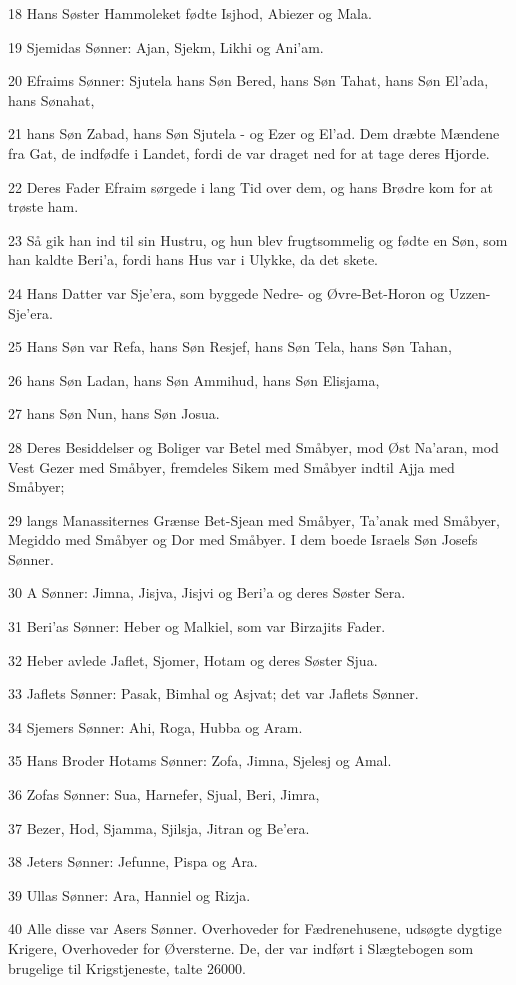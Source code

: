 \par 18 Hans Søster Hammoleket fødte Isjhod, Abiezer og Mala.
\par 19 Sjemidas Sønner: Ajan, Sjekm, Likhi og Ani'am.
\par 20 Efraims Sønner: Sjutela hans Søn Bered, hans Søn Tahat, hans Søn El'ada, hans Sønahat,
\par 21 hans Søn Zabad, hans Søn Sjutela - og Ezer og El'ad. Dem dræbte Mændene fra Gat, de indfødfe i Landet, fordi de var draget ned for at tage deres Hjorde.
\par 22 Deres Fader Efraim sørgede i lang Tid over dem, og hans Brødre kom for at trøste ham.
\par 23 Så gik han ind til sin Hustru, og hun blev frugtsommelig og fødte en Søn, som han kaldte Beri'a, fordi hans Hus var i Ulykke, da det skete.
\par 24 Hans Datter var Sje'era, som byggede Nedre- og Øvre-Bet-Horon og Uzzen-Sje'era.
\par 25 Hans Søn var Refa, hans Søn Resjef, hans Søn Tela, hans Søn Tahan,
\par 26 hans Søn Ladan, hans Søn Ammihud, hans Søn Elisjama,
\par 27 hans Søn Nun, hans Søn Josua.
\par 28 Deres Besiddelser og Boliger var Betel med Småbyer, mod Øst Na'aran, mod Vest Gezer med Småbyer, fremdeles Sikem med Småbyer indtil Ajja med Småbyer;
\par 29 langs Manassiternes Grænse Bet-Sjean med Småbyer, Ta'anak med Småbyer, Megiddo med Småbyer og Dor med Småbyer. I dem boede Israels Søn Josefs Sønner.
\par 30 A Sønner: Jimna, Jisjva, Jisjvi og Beri'a og deres Søster Sera.
\par 31 Beri'as Sønner: Heber og Malkiel, som var Birzajits Fader.
\par 32 Heber avlede Jaflet, Sjomer, Hotam og deres Søster Sjua.
\par 33 Jaflets Sønner: Pasak, Bimhal og Asjvat; det var Jaflets Sønner.
\par 34 Sjemers Sønner: Ahi, Roga, Hubba og Aram.
\par 35 Hans Broder Hotams Sønner: Zofa, Jimna, Sjelesj og Amal.
\par 36 Zofas Sønner: Sua, Harnefer, Sjual, Beri, Jimra,
\par 37 Bezer, Hod, Sjamma, Sjilsja, Jitran og Be'era.
\par 38 Jeters Sønner: Jefunne, Pispa og Ara.
\par 39 Ullas Sønner: Ara, Hanniel og Rizja.
\par 40 Alle disse var Asers Sønner. Overhoveder for Fædrenehusene, udsøgte dygtige Krigere, Overhoveder for Øversterne. De, der var indført i Slægtebogen som brugelige til Krigstjeneste, talte 26000.

